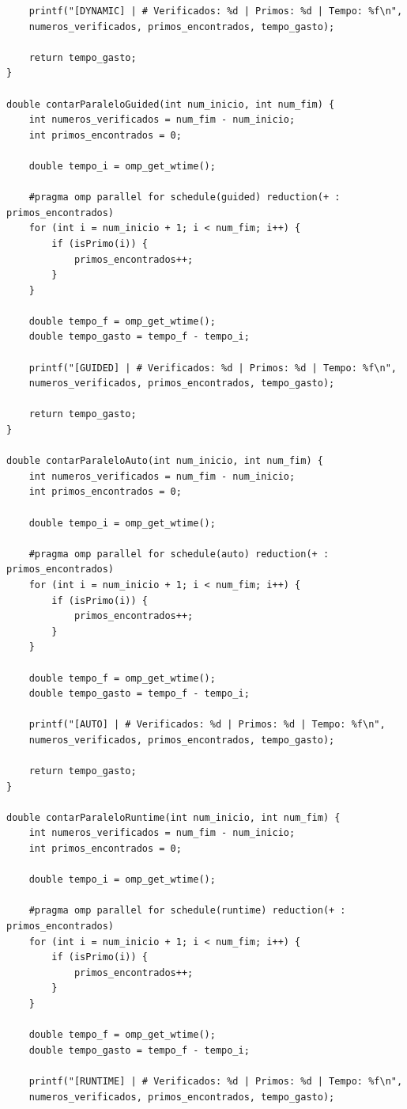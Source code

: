 \documentclass[12pt, openright, oneside, a4paper, brazil]{article}
\begin{document}
\begin{lstlisting}
	printf("[DYNAMIC] | # Verificados: %d | Primos: %d | Tempo: %f\n",
	numeros_verificados, primos_encontrados, tempo_gasto);
	
	return tempo_gasto;
}

double contarParaleloGuided(int num_inicio, int num_fim) {
	int numeros_verificados = num_fim - num_inicio;
	int primos_encontrados = 0;
	
	double tempo_i = omp_get_wtime();
	
	#pragma omp parallel for schedule(guided) reduction(+ : primos_encontrados)
	for (int i = num_inicio + 1; i < num_fim; i++) {
		if (isPrimo(i)) {
			primos_encontrados++;
		}
	}
	
	double tempo_f = omp_get_wtime();
	double tempo_gasto = tempo_f - tempo_i;
	
	printf("[GUIDED] | # Verificados: %d | Primos: %d | Tempo: %f\n",
	numeros_verificados, primos_encontrados, tempo_gasto);
	
	return tempo_gasto;
}

double contarParaleloAuto(int num_inicio, int num_fim) {
	int numeros_verificados = num_fim - num_inicio;
	int primos_encontrados = 0;
	
	double tempo_i = omp_get_wtime();
	
	#pragma omp parallel for schedule(auto) reduction(+ : primos_encontrados)
	for (int i = num_inicio + 1; i < num_fim; i++) {
		if (isPrimo(i)) {
			primos_encontrados++;
		}
	}
	
	double tempo_f = omp_get_wtime();
	double tempo_gasto = tempo_f - tempo_i;
	
	printf("[AUTO] | # Verificados: %d | Primos: %d | Tempo: %f\n",
	numeros_verificados, primos_encontrados, tempo_gasto);
	
	return tempo_gasto;
}

double contarParaleloRuntime(int num_inicio, int num_fim) {
	int numeros_verificados = num_fim - num_inicio;
	int primos_encontrados = 0;
	
	double tempo_i = omp_get_wtime();
	
	#pragma omp parallel for schedule(runtime) reduction(+ : primos_encontrados)
	for (int i = num_inicio + 1; i < num_fim; i++) {
		if (isPrimo(i)) {
			primos_encontrados++;
		}
	}
	
	double tempo_f = omp_get_wtime();
	double tempo_gasto = tempo_f - tempo_i;
	
	printf("[RUNTIME] | # Verificados: %d | Primos: %d | Tempo: %f\n",
	numeros_verificados, primos_encontrados, tempo_gasto);
	

\end{lstlisting}
\end{document}
